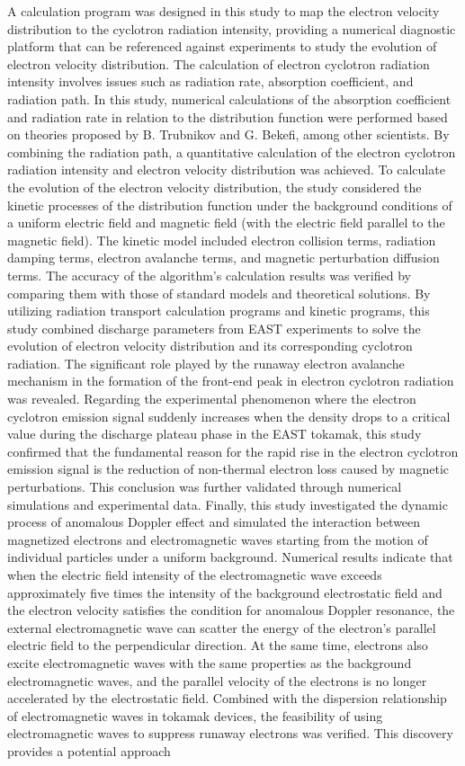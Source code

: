 \begin{abstract*}
A calculation program was designed in this study to map the electron velocity distribution to the cyclotron radiation intensity, providing a numerical diagnostic platform that can be referenced against experiments to study the evolution of electron velocity distribution. The calculation of electron cyclotron radiation intensity involves issues such as radiation rate, absorption coefficient, and radiation path. In this study, numerical calculations of the absorption coefficient and radiation rate in relation to the distribution function were performed based on theories proposed by B. Trubnikov and G. Bekefi, among other scientists. By combining the radiation path, a quantitative calculation of the electron cyclotron radiation intensity and electron velocity distribution was achieved. To calculate the evolution of the electron velocity distribution, the study considered the kinetic processes of the distribution function under the background conditions of a uniform electric field and magnetic field (with the electric field parallel to the magnetic field). The kinetic model included electron collision terms, radiation damping terms, electron avalanche terms, and magnetic perturbation diffusion terms. The accuracy of the algorithm's calculation results was verified by comparing them with those of standard models and theoretical solutions. By utilizing radiation transport calculation programs and kinetic programs, this study combined discharge parameters from EAST experiments to solve the evolution of electron velocity distribution and its corresponding cyclotron radiation. The significant role played by the runaway electron avalanche mechanism in the formation of the front-end peak in electron cyclotron radiation was revealed. Regarding the experimental phenomenon where the electron cyclotron emission signal suddenly increases when the density drops to a critical value during the discharge plateau phase in the EAST tokamak, this study confirmed that the fundamental reason for the rapid rise in the electron cyclotron emission signal is the reduction of non-thermal electron loss caused by magnetic perturbations. This conclusion was further validated through numerical simulations and experimental data. Finally, this study investigated the dynamic process of anomalous Doppler effect and simulated the interaction between magnetized electrons and electromagnetic waves starting from the motion of individual particles under a uniform background. Numerical results indicate that when the electric field intensity of the electromagnetic wave exceeds approximately five times the intensity of the background electrostatic field and the electron velocity satisfies the condition for anomalous Doppler resonance, the external electromagnetic wave can scatter the energy of the electron's parallel electric field to the perpendicular direction. At the same time, electrons also excite electromagnetic waves with the same properties as the background electromagnetic waves, and the parallel velocity of the electrons is no longer accelerated by the electrostatic field. Combined with the dispersion relationship of electromagnetic waves in tokamak devices, the feasibility of using electromagnetic waves to suppress runaway electrons was verified. This discovery provides a potential approach 
\end{abstract*}
